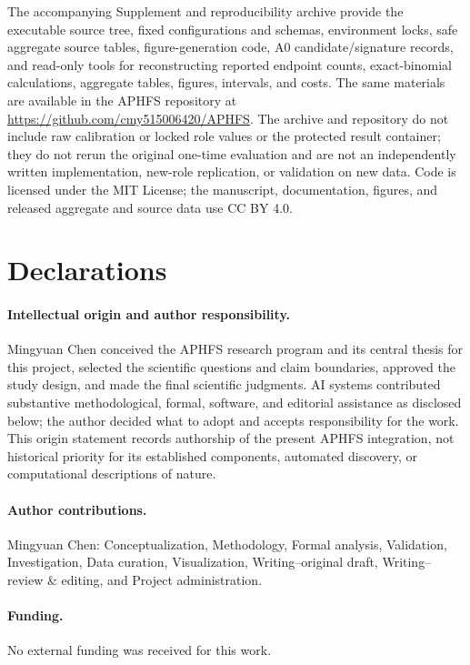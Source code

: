 \documentclass[10pt]{article}
\theoremstyle{definition}
\begin{document}
The accompanying Supplement and reproducibility archive provide the executable source tree,
fixed configurations and schemas, environment locks, safe aggregate source tables,
figure-generation code, A0 candidate/signature records, and read-only tools for reconstructing
reported endpoint counts, exact-binomial calculations, aggregate tables, figures, intervals, and
costs. The same materials are available in the APHFS repository at
\url{https://github.com/cmy515006420/APHFS}. The archive and repository do not include raw
calibration or locked role values or the protected result container; they do not rerun the
original one-time evaluation and are not an independently written implementation, new-role
replication, or validation on new data. Code is licensed under the MIT License; the manuscript,
documentation, figures, and released aggregate and source data use CC BY 4.0.

\section{Declarations}

\paragraph{Intellectual origin and author responsibility.}
Mingyuan Chen conceived the APHFS research program and its central thesis for this project,
selected the scientific questions and claim boundaries, approved the study design, and made the
final scientific judgments. AI systems contributed substantive methodological, formal, software,
and editorial assistance as disclosed below; the author decided what to adopt and accepts
responsibility for the work. This origin statement records authorship of the present APHFS
integration, not historical priority for its established components, automated discovery, or
computational descriptions of nature.

\paragraph{Author contributions.}
Mingyuan Chen: Conceptualization, Methodology, Formal analysis, Validation,
Investigation, Data curation, Visualization, Writing--original draft, Writing--review \& editing,
and Project administration.

\paragraph{Funding.}
No external funding was received for this work.
\end{document}
